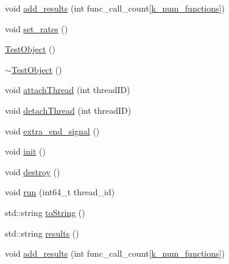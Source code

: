 \begin{DoxyCompactItemize}
\item 
void \hyperlink{class_test_object_a30655b96ad192de48772ad45036a38a3}{add\+\_\+results} (int func\+\_\+call\+\_\+count\mbox{[}\hyperlink{class_test_object_a2eafe110f35fcae7fa739cd52f02392a}{k\+\_\+num\+\_\+functions}\mbox{]})
\item 
void \hyperlink{class_test_object_adfad75ad3f6c014f68ff2cdc4e752fc9}{set\+\_\+rates} ()
\item 
\hyperlink{class_test_object_a3d0036f18982129567596b06d72087b6}{Test\+Object} ()
\item 
\hyperlink{class_test_object_a3262a3065422e5ebd007e38c4c50d01f}{$\sim$\+Test\+Object} ()
\item 
void \hyperlink{class_test_object_a9aec85cd402d269ccf81cca9dcb4c31e}{attach\+Thread} (int thread\+I\+D)
\item 
void \hyperlink{class_test_object_acf21dd1257cae9a96c4ea39233929027}{detach\+Thread} (int thread\+I\+D)
\item 
void \hyperlink{class_test_object_a7c5bccd9eb5900850169d39a22db8c53}{extra\+\_\+end\+\_\+signal} ()
\item 
void \hyperlink{class_test_object_acc6255f8f3e0f9e1a09955cc7f53caff}{init} ()
\item 
void \hyperlink{class_test_object_a30dbc74cb72669dd4d0cec14baa92bc9}{destroy} ()
\item 
void \hyperlink{class_test_object_ae0ac39cc52730e2c60961ea495b34550}{run} (int64\+\_\+t thread\+\_\+id)
\item 
std\+::string \hyperlink{class_test_object_af09564f241ed447b17ab16ef751eef8e}{to\+String} ()
\item 
std\+::string \hyperlink{class_test_object_a39bb7ef595355ab7459e992b85b045d8}{results} ()
\item 
void \hyperlink{class_test_object_a30655b96ad192de48772ad45036a38a3}{add\+\_\+results} (int func\+\_\+call\+\_\+count\mbox{[}\hyperlink{class_test_object_a2eafe110f35fcae7fa739cd52f02392a}{k\+\_\+num\+\_\+functions}\mbox{]})
\end{DoxyCompactItemize}
